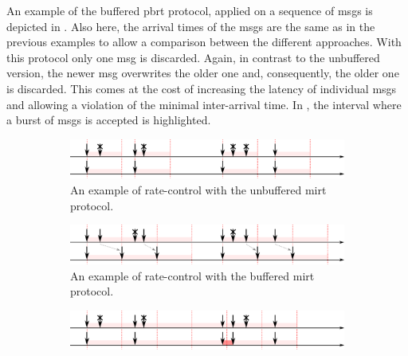 An example of the buffered \gls{pbrt} protocol, applied on a sequence of \glspl*{msg} is depicted in \Fig{\ref{fig_rate_ctl_bpbrt}}.
Also here, the arrival times of the \glspl*{msg} are the same as in the previous examples to allow a comparison between the different approaches.
With this protocol only one \gls*{msg} is discarded.
Again, in contrast to the unbuffered version, the newer \gls*{msg} overwrites the older one and, consequently, the older one is discarded.
This comes at the cost of increasing the latency of individual \glspl*{msg} and allowing a violation of the minimal inter-arrival time.
In \Fig{\ref{fig_rate_ctl_bpbrt}}, the interval where a burst of \glspl*{msg} is accepted is highlighted.

\begin{figure}[bht]
    \TopFigSpace
    \centering
    \begin{subfigure}[h]{\linewidth}
        \centering
        \includegraphics[width=12cm]{fig/rate_control_mirt.pdf}
        \CaptionFigSpace
        \caption{An example of rate-control with the unbuffered \gls{mirt} protocol.}
        \label{fig_rate_ctl_mirt}
        \vspace{1em}
    \end{subfigure}
    \begin{subfigure}[h]{\linewidth}
        \centering
        \includegraphics[width=12cm]{fig/rate_control_bmirt.pdf}
        \CaptionFigSpace
        \caption{An example of rate-control with the buffered \gls{mirt} protocol.}
        \label{fig_rate_ctl_bmirt}
        \vspace{1em}
    \end{subfigure}
    \begin{subfigure}[h]{\linewidth}
        \centering
        \includegraphics[width=12cm]{fig/rate_control_pbrt.pdf}

\end{subfigure}
\end{figure}
